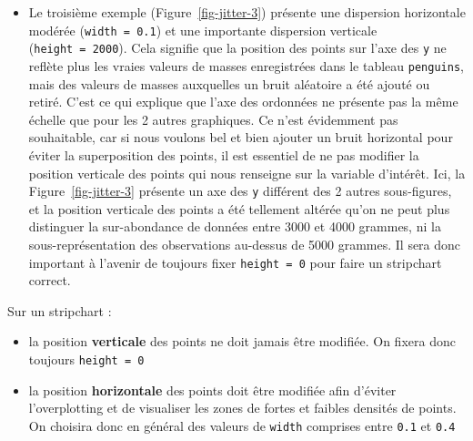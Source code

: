 \documentclass[
  a4paper,
  DIV=11,
  numbers=noendperiod,
  oneside]{scrreprt}
\providecommand{\tightlist}{%
  \setlength{\itemsep}{0pt}\setlength{\parskip}{0pt}}\usepackage{longtable,booktabs,array}
\begin{document}
\begin{itemize}
\item
  Le troisième exemple (Figure~\ref{fig-jitter-3}) présente une
  dispersion horizontale modérée (\texttt{width\ =\ 0.1}) et une
  importante dispersion verticale (\texttt{height\ =\ 2000}). Cela
  signifie que la position des points sur l'axe des \texttt{y} ne
  reflète plus les vraies valeurs de masses enregistrées dans le tableau
  \texttt{penguins}, mais des valeurs de masses auxquelles un bruit
  aléatoire a été ajouté ou retiré. C'est ce qui explique que l'axe des
  ordonnées ne présente pas la même échelle que pour les 2 autres
  graphiques. Ce n'est évidemment pas souhaitable, car si nous voulons
  bel et bien ajouter un bruit horizontal pour éviter la superposition
  des points, il est essentiel de ne pas modifier la position verticale
  des points qui nous renseigne sur la variable d'intérêt. Ici, la
  Figure~\ref{fig-jitter-3} présente un axe des \texttt{y} différent des
  2 autres sous-figures, et la position verticale des points a été
  tellement altérée qu'on ne peut plus distinguer la sur-abondance de
  données entre 3000 et 4000 grammes, ni la sous-représentation des
  observations au-dessus de 5000 grammes. Il sera donc important à
  l'avenir de toujours fixer \texttt{height\ =\ 0} pour faire un
  stripchart correct.
\end{itemize}

\begin{tcolorbox}[enhanced jigsaw, arc=.35mm, opacityback=0, colbacktitle=quarto-callout-important-color!10!white, bottomrule=.15mm, coltitle=black, colframe=quarto-callout-important-color-frame, breakable, toprule=.15mm, title=\textcolor{quarto-callout-important-color}{\faExclamation}\hspace{0.5em}{Important}, leftrule=.75mm, titlerule=0mm, bottomtitle=1mm, toptitle=1mm, left=2mm, rightrule=.15mm, opacitybacktitle=0.6, colback=white]

Sur un stripchart :

\begin{itemize}
\tightlist
\item
  la position \textbf{verticale} des points ne doit jamais être
  modifiée. On fixera donc toujours \texttt{height\ =\ 0}
\item
  la position \textbf{horizontale} des points doit être modifiée afin
  d'éviter l'overplotting et de visualiser les zones de fortes et
  faibles densités de points. On choisira donc en général des valeurs de
  \texttt{width} comprises entre \texttt{0.1} et \texttt{0.4}
\end{itemize}

\end{tcolorbox}
\end{document}

